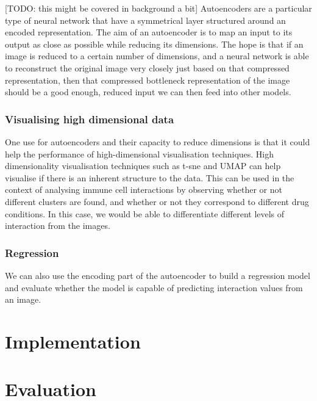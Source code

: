 \documentclass{l4proj}
\begin{document}
[TODO: this might be covered in background a bit]
Autoencoders are a particular type of neural network that have a symmetrical layer structured around an encoded representation. The aim of an autoencoder is to map an input to its output as close as possible while reducing its dimensions. The hope is that if an image is reduced to a certain number of dimensions, and a neural network is able to reconstruct the original image very closely just based on that compressed representation, then that compressed bottleneck representation of the image should be a good enough, reduced input we can then feed into other models.


\subsection{Visualising high dimensional data}

One use for autoencoders and their capacity to reduce dimensions is that it could help the performance of high-dimensional visualisation techniques. High dimensionality visualisation techniques such as t-sne and UMAP can help visualise if there is an inherent structure to the data. This can be used in the context of analysing immune cell interactions by observing whether or not different clusters are found, and whether or not they correspond to different drug conditions. In this case, we would be able to differentiate different levels of interaction from the images.

\subsection{Regression}

We can also use the encoding part of the autoencoder to build a regression model and evaluate whether the model is capable of predicting interaction values from an image.



\chapter{Implementation}

\chapter{Evaluation}
\end{document}
